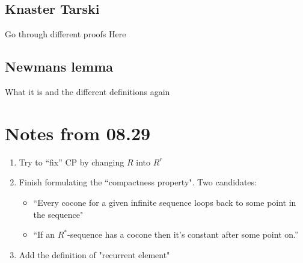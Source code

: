 \documentclass{scrartcl}
\begin{document}
\subsection{Knaster Tarski}
Go through different proofs Here

\subsection{Newmans lemma}
What it is and the different definitions again

\subsection{}

\section{Notes from 08.29}

\begin{enumerate}
  \item Try to ``fix'' CP by changing $R$ into $R^r$
  \item Finish formulating the ``compactness property".  Two candidates:
  \begin{itemize}
    \item ``Every cocone for a given infinite sequence loops back to some point in the sequence"
    \item ``If an $R^*$-sequence has a cocone then it's constant after some point on.''
  \end{itemize}
  \item Add the definition of "recurrent element"
\end{enumerate}
\end{document}
